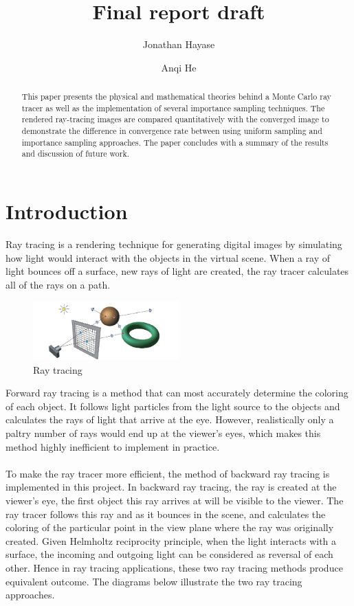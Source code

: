 \documentclass[12pt]{article}
\title{Final report draft}
\author{Jonathan Hayase\and Anqi He}
\begin{document}
\maketitle
\begin{abstract}\noindent
This paper presents the physical and mathematical theories behind a Monte Carlo ray tracer as well as the implementation of several importance sampling techniques. The rendered ray-tracing images are compared quantitatively with the converged image to demonstrate the difference in convergence rate between using uniform sampling and importance sampling approaches. The paper concludes with a summary of the results and discussion of future work.
\end{abstract}

\section{Introduction}
Ray tracing is a rendering technique for generating digital images by simulating how light would interact with the objects in the virtual scene. When a ray of light bounces off a surface, new rays of light are created, the ray tracer calculates all of the rays on a path. \\
\begin{figure}[ht]
  \centering
    \includegraphics[width=0.5\textwidth]{figure1.png}
    \caption{Ray tracing}
\end{figure}
Forward ray tracing is a method that can most accurately determine the coloring of each object. It follows light particles from the light source to the objects and calculates the rays of light that arrive at the eye. However, realistically only a paltry number of rays would end up at the viewer's eyes, which makes this method highly inefficient to implement in practice.\\\\
To make the ray tracer more efficient, the method of backward ray tracing is implemented in this project. In backward ray tracing, the ray is created at the viewer's eye, the first object this ray arrives at will be visible to the viewer. The ray tracer follows this ray and as it bounces in the scene, and calculates the coloring of the particular point in the view plane where the ray was originally created. Given Helmholtz reciprocity principle, when the light interacts with a surface, the incoming and outgoing light can be considered as reversal of each other. Hence in ray tracing applications, these two ray tracing methods produce equivalent outcome. The diagrams below illustrate the two ray tracing approaches. \\
\end{document}
